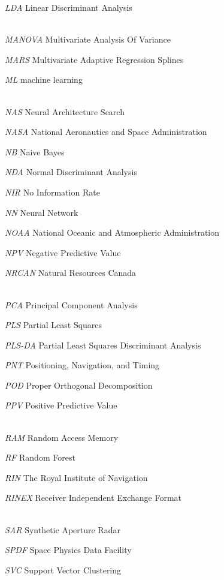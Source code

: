 \documentclass[sn-mathphys-num]{sn-jnl}%
\begin{document}
\textit{LDA} Linear Discriminant Analysis


\\[2\baselineskip]

\textit{MANOVA} Multivariate Analysis Of Variance

\textit{MARS} Multivariate Adaptive Regression Splines

\textit{ML} machine learning


\\[2\baselineskip]

\textit{NAS} Neural Architecture Search

\textit{NASA} National Aeronautics and Space Administration

\textit{NB} Naive Bayes

\textit{NDA} Normal Discriminant Analysis

\textit{NIR} No Information Rate

\textit{NN} Neural Network

\textit{NOAA} National Oceanic and Atmospheric Administration

\textit{NPV} Negative Predictive Value

\textit{NRCAN} Natural Resources Canada


\\[2\baselineskip]

\textit{PCA} Principal Component Analysis

\textit{PLS} Partial Least Squares

\textit{PLS-DA} Partial Least Squares Discriminant Analysis

\textit{PNT} Positioning, Navigation, and Timing

\textit{POD} Proper Orthogonal Decomposition

\textit{PPV} Positive Predictive Value


\\[2\baselineskip]

\textit{RAM} Random Access Memory

\textit{RF} Random Forest

\textit{RIN} The Royal Institute of Navigation

\textit{RINEX} Receiver Independent Exchange Format


\\[2\baselineskip]

\textit{SAR} Synthetic Aperture Radar

\textit{SPDF} Space Physics Data Facility

\textit{SVC} Support Vector Clustering
\end{document}
